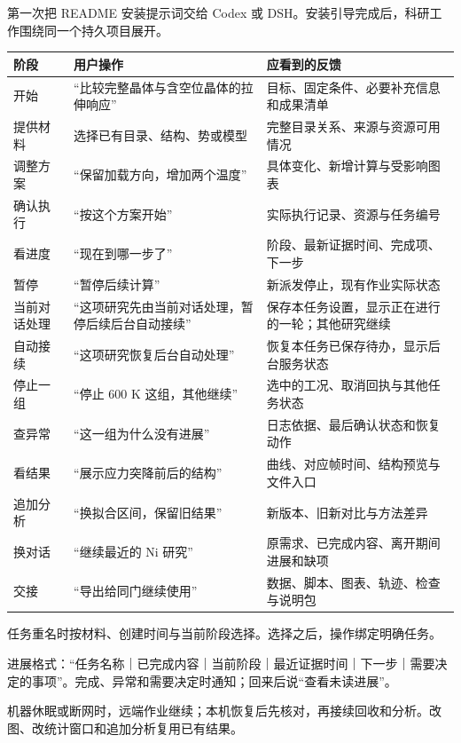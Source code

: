 \documentclass[11pt,a4paper]{ctexart}
\begin{document}
第一次把 README 安装提示词交给 Codex 或 DSH。安装引导完成后，科研工作围绕同一个持久项目展开。



\begin{longtable}{p{4.67cm}p{4.67cm}p{4.67cm}}
\toprule
阶段 & 用户操作 & 应看到的反馈 \\
\midrule\endhead
开始 & “比较完整晶体与含空位晶体的拉伸响应” & 目标、固定条件、必要补充信息和成果清单 \\
提供材料 & 选择已有目录、结构、势或模型 & 完整目录关系、来源与资源可用情况 \\
调整方案 & “保留加载方向，增加两个温度” & 具体变化、新增计算与受影响图表 \\
确认执行 & “按这个方案开始” & 实际执行记录、资源与任务编号 \\
看进度 & “现在到哪一步了” & 阶段、最新证据时间、完成项、下一步 \\
暂停 & “暂停后续计算” & 新派发停止，现有作业实际状态 \\
当前对话处理 & “这项研究先由当前对话处理，暂停后续后台自动接续” & 保存本任务设置，显示正在进行的一轮；其他研究继续 \\
自动接续 & “这项研究恢复后台自动处理” & 恢复本任务已保存待办，显示后台服务状态 \\
停止一组 & “停止 600 K 这组，其他继续” & 选中的工况、取消回执与其他任务状态 \\
查异常 & “这一组为什么没有进展” & 日志依据、最后确认状态和恢复动作 \\
看结果 & “展示应力突降前后的结构” & 曲线、对应帧时间、结构预览与文件入口 \\
追加分析 & “换拟合区间，保留旧结果” & 新版本、旧新对比与方法差异 \\
换对话 & “继续最近的 Ni 研究” & 原需求、已完成内容、离开期间进展和缺项 \\
交接 & “导出给同门继续使用” & 数据、脚本、图表、轨迹、检查与说明包 \\
\bottomrule
\end{longtable}


任务重名时按材料、创建时间与当前阶段选择。选择之后，操作绑定明确任务。



进展格式：“任务名称｜已完成内容｜当前阶段｜最近证据时间｜下一步｜需要决定的事项”。完成、异常和需要决定时通知；回来后说“查看未读进展”。



机器休眠或断网时，远端作业继续；本机恢复后先核对，再接续回收和分析。改图、改统计窗口和追加分析复用已有结果。
\end{document}

